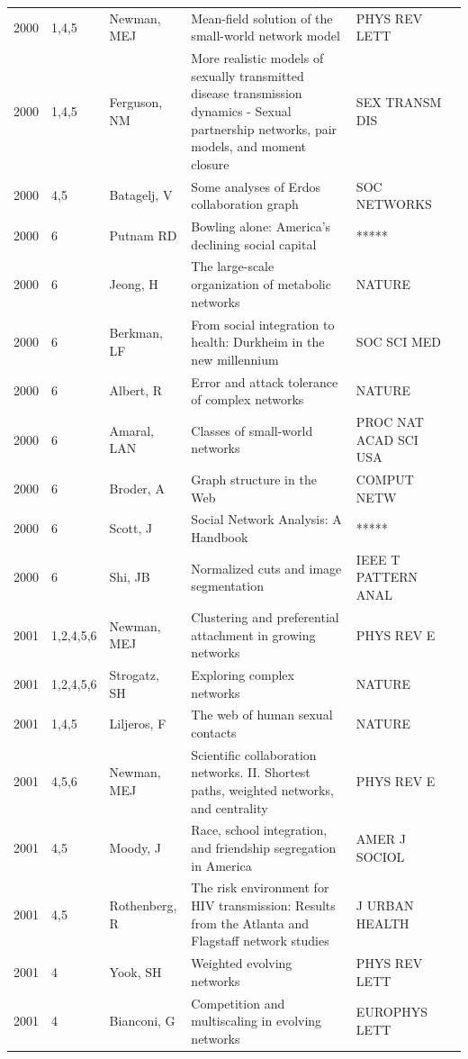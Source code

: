 \documentclass[11pt]{article} %
\begin{document}
\begin{longtable}{p{0.8cm}|p{1.25cm}|p{2.8cm}|p{7.5cm}|p{3cm}l}
2000&	1,4,5&	Newman, MEJ&	 Mean-field solution of the small-world network model&         	PHYS REV LETT\\
2000&	1,4,5&	Ferguson, NM&	 More realistic models of sexually transmitted disease transmission dynamics - Sexual partnership networks, pair models, and moment closure&         	SEX TRANSM DIS\\
2000&	4,5&	Batagelj, V&	 Some analyses of Erdos collaboration graph&         	SOC NETWORKS\\
2000&	6&	Putnam RD &	Bowling alone: America’s declining social capital&         	*****\\
2000&	6&	Jeong, H&	 The large-scale organization of metabolic networks&         	NATURE\\
2000&	6&	Berkman, LF&	 From social integration to health: Durkheim in the new millennium&         	SOC SCI MED\\
2000&	6&	Albert, R&	 Error and attack tolerance of complex networks&         	NATURE\\
2000&	6&	Amaral, LAN&	 Classes of small-world networks&         	PROC NAT ACAD SCI USA\\
2000&	6&	Broder, A&	 Graph structure in the Web&         	COMPUT NETW\\
2000&	6&	Scott, J&	 Social Network Analysis: A Handbook&         	*****\\
2000&	6&	Shi, JB&	 Normalized cuts and image segmentation&         	IEEE T PATTERN ANAL\\
2001&	1,2,4,5,6&	Newman, MEJ&	 Clustering and preferential attachment in growing networks&         	PHYS REV E\\
2001&	1,2,4,5,6&	Strogatz, SH&	 Exploring complex networks&         	NATURE\\
2001&	1,4,5&	Liljeros, F&	 The web of human sexual contacts&         	NATURE\\
2001&	4,5,6&	Newman, MEJ&	 Scientific collaboration networks. II. Shortest paths, weighted networks, and centrality&         	PHYS REV E\\
2001&	4,5&	Moody, J&	 Race, school integration, and friendship segregation in America&         	AMER J SOCIOL\\
2001&	4,5&	Rothenberg, R&	 The risk environment for HIV transmission: Results from the Atlanta and Flagstaff network studies&         	J URBAN HEALTH\\
2001&	4&	Yook, SH&	 Weighted evolving networks&         	PHYS REV LETT\\
2001&	4&	Bianconi, G&	 Competition and multiscaling in evolving networks&         	EUROPHYS LETT\\

\end{longtable}
\end{document}
